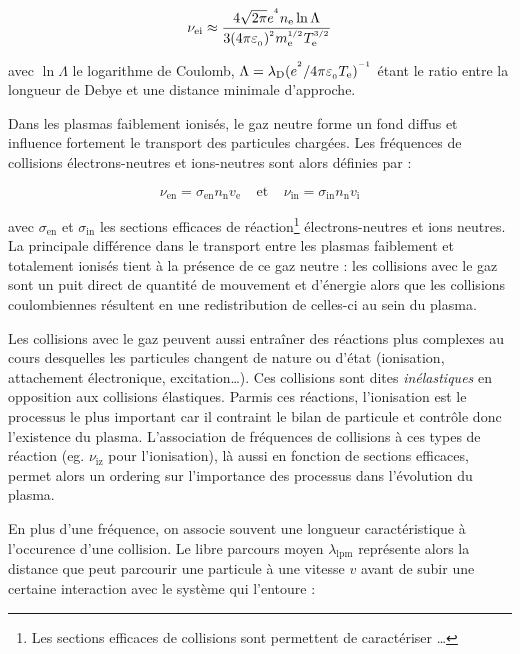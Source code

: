 \begin{equation}
	\nu_\text{ei}\approx\frac{4\sqrt{2\pi}e^{^{4}} n_\text{e} \ln\Lambda
	}{3(4\pi\varepsilon_{_{0}})^{^{2}}m_\text{e}^{^{1/2}}T_\text{e}^{^{3/2}}}
\end{equation}

avec $\ln \Lambda$ le logarithme de Coulomb,
$\Lambda=\lambda_\text{D}(e^{^{2}}/4\pi\varepsilon_{_{0}}
T_\text{e})^{^{-1}}$ étant le ratio entre la longueur de Debye et une
distance minimale d'approche.

Dans les plasmas faiblement ionisés, le
gaz neutre forme un fond diffus et influence fortement le transport des particules chargées.
Les fréquences de collisions électrons-neutres et ions-neutres sont alors
définies par :

\begin{equation}
	\nu_\text{en}=\sigma_\text{en} n_\text{n} v_\text{e}
	\;\;\;\;\text{et}\;\;\;\;\nu_\text{in}=\sigma_\text{in} n_\text{n} v_\text{i}
\end{equation} 
 
avec $\sigma_\text{en}$ et $\sigma_\text{in}$ les sections efficaces de
réaction\footnote{Les sections efficaces de collisions sont permettent de
caractériser \ldots} électrons-neutres et ions neutres. La principale différence
dans le transport entre les plasmas faiblement et totalement ionisés tient à la
présence de ce gaz neutre : les collisions avec le gaz sont un puit
direct de quantité de mouvement et d'énergie alors que les
collisions coulombiennes résultent en une redistribution de celles-ci au sein
du plasma.

Les collisions avec le gaz peuvent aussi entraîner des réactions plus complexes
au cours desquelles les particules changent de nature ou d'état (ionisation,
attachement électronique, excitation\ldots).
Ces collisions sont dites \emph{inélastiques} en opposition aux collisions
élastiques. Parmis ces réactions, l'ionisation est le processus le plus
important car il contraint le bilan de particule et contrôle donc l'existence
du plasma. L'association de fréquences de collisions à ces types de réaction
(eg. $\nu_\text{iz}$ pour l'ionisation), là aussi en fonction de sections
efficaces, permet alors un ordering sur l'importance des processus dans l'évolution du plasma.

En plus d'une fréquence, on associe souvent une longueur caractéristique
à l'occurence d'une collision. Le libre parcours moyen $\lambda_\text{lpm}$
représente alors la distance que peut parcourir une particule à une vitesse
$v$ avant de subir une certaine interaction avec le système qui l'entoure :

